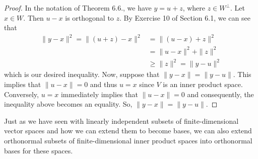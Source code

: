 \begin{proof}
In the notation of Theorem 6.6., we have \( y = u + z  \), where \( z \in W^{\perp} \). Let \( x \in W  \). Then \( u - x  \) is orthogonal to \( z  \). By Exercise 10 of Section 6.1, we can see that
\begin{align*}
    \| y  - x \|^{2} = \| (u+z) - x \|^{2} &= \| (u-x) + z \|^{2} \\
                                   &= \| u - x \|^{2} + \| z \|^{2} \\
                                   &\geq \| z \|^{2} = \| y - u \|^{2}
\end{align*}
which is our desired inequality. Now, suppose that \( \| y - x \| = \| y - u\| \). This implies that \( \| u - x \| = 0  \) and thus \( u = x  \) since \( V  \) is an inner product space. Conversely, \( u = x  \) immediately implies that \(  \| u - x \| = 0  \) and consequently, the inequality above becomes an equality. So, \( \| y - x \| = \| y - u \| \).
\end{proof}

Just as we have seen with linearly independent subsets of finite-dimensional vector spaces and how we can extend them to become bases, we can also extend orthonormal subsets of finite-dimensional inner product spaces into orthonormal bases for these spaces. 

